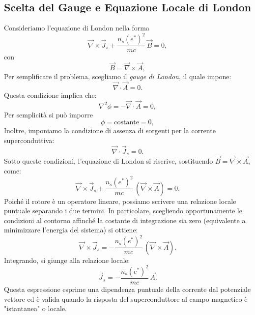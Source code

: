 \subsection{Scelta del Gauge e Equazione Locale di London}
Consideriamo l'equazione di London nella forma
\[
\vec{\nabla} \times \vec{J}_s + \frac{n_s (e^*)^2}{mc}\, \vec{B} = 0,
\]
con 
\[
\vec{B} = \vec{\nabla} \times \vec{A},
\]
Per semplificare il problema, scegliamo il \emph{gauge di London}, il quale impone:
\[
\vec{\nabla} \cdot \vec{A} = 0.
\]
Questa condizione implica che:
\[
\nabla^2\phi = - \vec{\nabla} \cdot \vec{A} = 0,
\]
 Per semplicità si può imporre
\[
\phi = \text{costante} = 0,
\]
Inoltre, imponiamo la condizione di assenza di sorgenti per la corrente superconduttiva:
\[
\vec{\nabla} \cdot \vec{J}_s = 0.
\]
Sotto queste condizioni, l'equazione di London si riscrive, sostituendo \(\vec{B} = \vec{\nabla} \times \vec{A}\), come:
\[
\vec{\nabla} \times \vec{J}_s + \frac{n_s (e^*)^2}{mc}\, (\vec{\nabla} \times \vec{A}) = 0.
\]
Poiché il rotore è un operatore lineare, possiamo scrivere una relazione locale puntuale separando i due termini. In particolare, scegliendo opportunamente le condizioni al contorno affinché la costante di integrazione sia zero (equivalente a minimizzare l'energia del sistema) si ottiene:
\[
\vec{\nabla} \times \vec{J}_s = -\frac{n_s (e^*)^2}{mc}\, (\vec{\nabla} \times \vec{A}).
\]
Integrando, si giunge alla relazione locale:
\[
\vec{J}_s = -\frac{n_s (e^*)^2}{mc}\, \vec{A}.
\]
Questa espressione esprime una dipendenza puntuale della corrente dal potenziale vettore ed è valida quando la risposta del superconduttore al campo magnetico è "istantanea" o locale.

